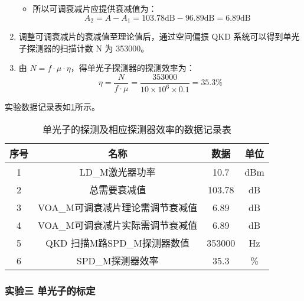 \documentclass[dvipsnames, svgnames,a4paper,11pt]{article}
\begin{document}
\begin{enumerate}
\begin{itemize}
					\item 所以可调衰减片应提供衰减值为：
						$$ A_2 = A - A_1 = 103.78 \mathrm{dB} - 96.89 \mathrm{dB} = 6.89 \mathrm{dB} $$

				\end{itemize}
			
			\item 调整可调衰减片的衰减值至理论值后，通过空间偏振 QKD 系统可以得到单光子探测器的扫描计数 N 为 353000。
			
			\item 由 $ N = f \cdot \mu \cdot \eta $，得单光子探测器的探测效率为：
				$$ \eta = \frac{N}{f \cdot \mu} = \frac{353000}{10 \times 10^{6} \times 0.1} = 35.3 \% $$

		\end{enumerate}

		实验数据记录表如\cref{tbl:D3-2-1}所示。

		\begin{table}[htbp]
			\centering
			\begin{tabular}{|c|c|cc|} 
			\hline
			序号 & 名称                  & 数据     & 单位   \\ 
			\hline
			1  & LD\_M激光器功率          & 10.7   & dBm  \\
			2  & 总需要衰减值              & 103.78 & dB   \\
			3  & VOA\_M可调衰减片理论需调节衰减值 & 6.89  & dB   \\
			4  & VOA\_M可调衰减片实际需调节衰减值 & 6.89   & dB   \\
			5  & QKD 扫描M路SPD\_M探测器数值 & 353000 & Hz   \\
			6  & SPD\_M探测器效率         & 35.3   & \%   \\
			\hline
			\end{tabular}
			\caption{单光子的探测及相应探测器效率的数据记录表}
			\label{tbl:D3-2-1}
		\end{table}
		

	\subsubsection{实验三 \quad 单光子的标定}
	\label{subsection2.1.3}
\end{document}
